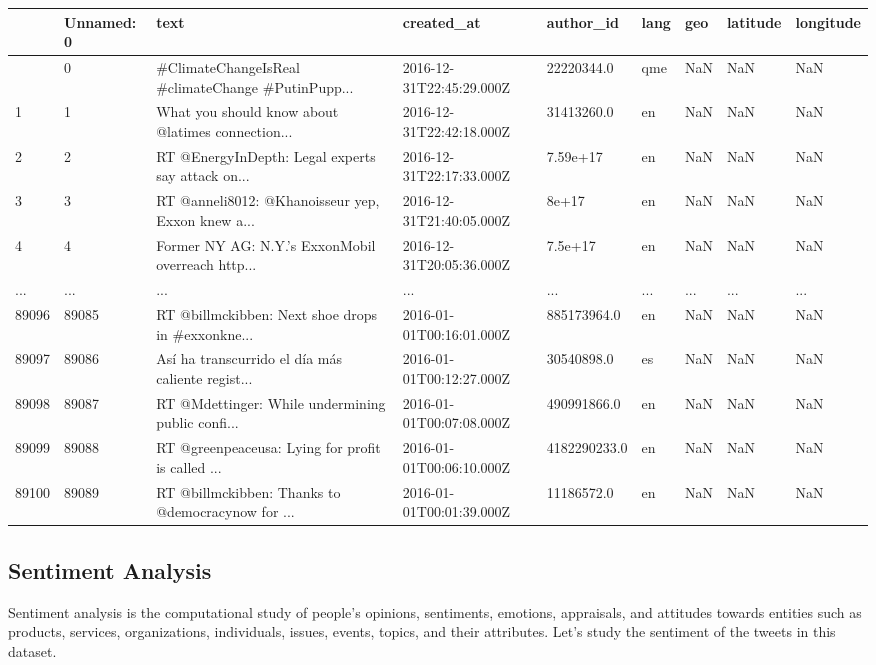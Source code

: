 \documentclass[
  letterpaper,
  DIV=11,
  numbers=noendperiod]{scrreprt}
\begin{document}
\begin{longtable}[]{@{}lllllllll@{}}
\toprule\noalign{}
& Unnamed: 0 & text & created\_at & author\_id & lang & geo & latitude &
longitude \\
\midrule\noalign{}
\endhead
\bottomrule\noalign{}
\endlastfoot
0 & 0 & \#ClimateChangeIsReal \#climateChange \#PutinPupp... &
2016-12-31T22:45:29.000Z & 22220344.0 & qme & NaN & NaN & NaN \\
1 & 1 & What you should know about @latimes connection... &
2016-12-31T22:42:18.000Z & 31413260.0 & en & NaN & NaN & NaN \\
2 & 2 & RT @EnergyInDepth: Legal experts say attack on... &
2016-12-31T22:17:33.000Z & 7.59e+17 & en & NaN & NaN & NaN \\
3 & 3 & RT @anneli8012: @Khanoisseur yep, Exxon knew a... &
2016-12-31T21:40:05.000Z & 8e+17 & en & NaN & NaN & NaN \\
4 & 4 & Former NY AG: N.Y.'s ExxonMobil overreach http... &
2016-12-31T20:05:36.000Z & 7.5e+17 & en & NaN & NaN & NaN \\
... & ... & ... & ... & ... & ... & ... & ... & ... \\
89096 & 89085 & RT @billmckibben: Next shoe drops in \#exxonkne... &
2016-01-01T00:16:01.000Z & 885173964.0 & en & NaN & NaN & NaN \\
89097 & 89086 & Así ha transcurrido el día más caliente regist... &
2016-01-01T00:12:27.000Z & 30540898.0 & es & NaN & NaN & NaN \\
89098 & 89087 & RT @Mdettinger: While undermining public confi... &
2016-01-01T00:07:08.000Z & 490991866.0 & en & NaN & NaN & NaN \\
89099 & 89088 & RT @greenpeaceusa: Lying for profit is called ... &
2016-01-01T00:06:10.000Z & 4182290233.0 & en & NaN & NaN & NaN \\
89100 & 89089 & RT @billmckibben: Thanks to @democracynow for ... &
2016-01-01T00:01:39.000Z & 11186572.0 & en & NaN & NaN & NaN \\
\end{longtable}

\hypertarget{sentiment-analysis}{%
\subsection{Sentiment Analysis}\label{sentiment-analysis}}

Sentiment analysis is the computational study of people's opinions,
sentiments, emotions, appraisals, and attitudes towards entities such as
products, services, organizations, individuals, issues, events, topics,
and their attributes. Let's study the sentiment of the tweets in this
dataset.
\end{document}
